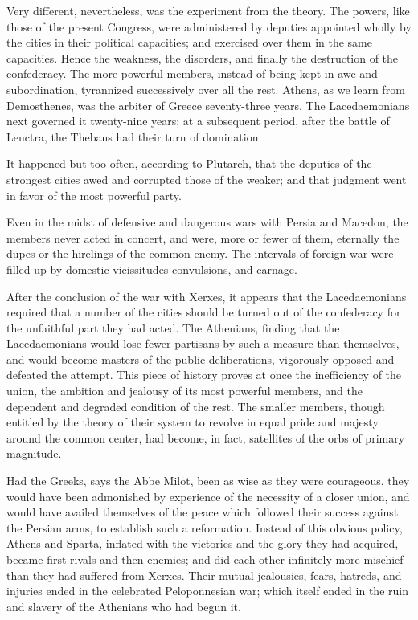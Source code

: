 Very different, nevertheless, was the experiment from the theory. 
The powers, like those of the present Congress, were administered by deputies appointed wholly by the cities in their political capacities; and exercised over them in the same capacities. 
Hence the weakness, the disorders, and finally the destruction of the confederacy. 
The more powerful members, instead of being kept in awe and subordination, tyrannized successively over all the rest. 
Athens, as we learn from Demosthenes, was the arbiter of Greece seventy-three years. 
The Lacedaemonians next governed it twenty-nine years; at a subsequent period, after the battle of Leuctra, the Thebans had their turn of domination.

It happened but too often, according to Plutarch, that the deputies of the strongest cities awed and corrupted those of the weaker; and that judgment went in favor of the most powerful party.

Even in the midst of defensive and dangerous wars with Persia and Macedon, the members never acted in concert, and were, more or fewer of them, eternally the dupes or the hirelings of the common enemy. 
The intervals of foreign war were filled up by domestic vicissitudes convulsions, and carnage.

After the conclusion of the war with Xerxes, it appears that the Lacedaemonians required that a number of the cities should be turned out of the confederacy for the unfaithful part they had acted. 
The Athenians, finding that the Lacedaemonians would lose fewer partisans by such a measure than themselves, and would become masters of the public deliberations, vigorously opposed and defeated the attempt. 
This piece of history proves at once the inefficiency of the union, the ambition and jealousy of its most powerful members, and the dependent and degraded condition of the rest. 
The smaller members, though entitled by the theory of their system to revolve in equal pride and majesty around the common center, had become, in fact, satellites of the orbs of primary magnitude.

Had the Greeks, says the Abbe Milot, been as wise as they were courageous, they would have been admonished by experience of the necessity of a closer union, and would have availed themselves of the peace which followed their success against the Persian arms, to establish such a reformation. 
Instead of this obvious policy, Athens and Sparta, inflated with the victories and the glory they had acquired, became first rivals and then enemies; and did each other infinitely more mischief than they had suffered from Xerxes. 
Their mutual jealousies, fears, hatreds, and injuries ended in the celebrated Peloponnesian war; which itself ended in the ruin and slavery of the Athenians who had begun it.

